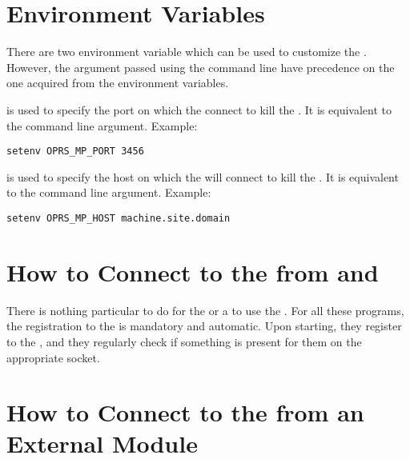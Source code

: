 \section{\MPK{} Environment Variables}

There are two environment variable which can be used to customize the
\MPK{}. However, the  argument passed using the command line
have precedence on the one acquired from the environment variables.

\begin{description}

\item[\code{OPRS\_MP\_PORT}] is used  to specify the port on which the \MPK{}
connect to kill the \MPA{}. It is equivalent to the  command line
argument.\* 
Example:
\begin{verbatim}
setenv OPRS_MP_PORT 3456
\end{verbatim}

\item[\code{OPRS\_MP\_HOST}] is used  to specify the host on which the \MPK{} will
connect to kill the \MPA{}. It is equivalent to the  command line argument.\* 
Example:
\begin{verbatim}
setenv OPRS_MP_HOST machine.site.domain
\end{verbatim}

\end{description}

\section{How to Connect to the \MPA{} from \OPRSS{} and \CPK{}}

There is nothing particular to do for the \OPRSS{} or a \CPK{} to use the
\MPA{}. For all these programs, the registration to the \MPA{} is mandatory and
automatic. Upon starting, they register to the \MPA{}, and they regularly check
if something is present for them on the appropriate socket.

\section{How to Connect to the \MPA{} from an External Module}

